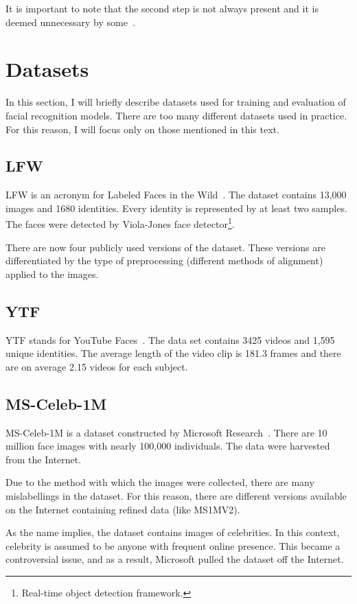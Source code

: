 It is important to note that the second step is not always present and it is deemed unnecessary by some~\cite{FaceNet}.

\section{Datasets}\label{sec:datasets}
In this section, I will briefly describe datasets used for training and evaluation of facial recognition models.
There are too many different datasets used in practice.
For this reason, I will focus only on those mentioned in this text.

\subsection{LFW}\label{subsec:lfw}
LFW is an acronym for Labeled Faces in the Wild~\cite{LFW}.
The dataset contains 13,000 images and 1680 identities.
Every identity is represented by at least two samples.
The faces were detected by Viola-Jones face detector\footnote{Real-time object detection framework.}.

There are now four publicly used versions of the dataset.
These versions are differentiated by the type of preprocessing (different methods of alignment) applied to the images.

\subsection{YTF}\label{subsec:ytf}
YTF stands for YouTube Faces~\cite{YTF}.
The data set contains 3425 videos and 1,595 unique identities.
The average length of the video clip is 181.3 frames and there are on average 2.15 videos for each subject.

\subsection{MS-Celeb-1M}\label{subsec:ms1m}
MS-Celeb-1M is a dataset constructed by Microsoft Research~\cite{MSCeleb1M}.
There are 10 million face images with nearly 100,000 individuals.
The data were harvested from the Internet.

Due to the method with which the images were collected, there are many mislabellings in the dataset.
For this reason, there are different versions available on the Internet containing refined data (like MS1MV2).

As the name implies, the dataset contains images of celebrities.
In this context, celebrity is assumed to be anyone with frequent online presence.
This became a controversial issue, and as a result, Microsoft pulled the dataset off the Internet.



